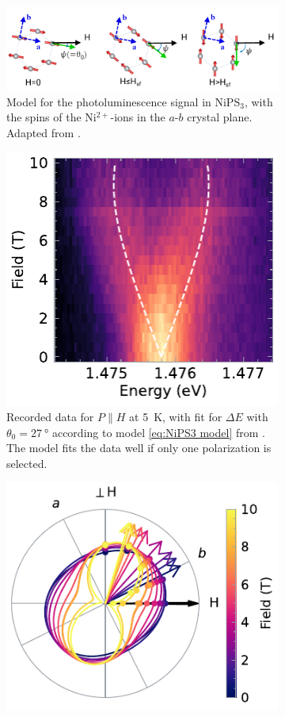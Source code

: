 \documentclass[
	twoside,
	parskip=half,
	a4paper,
]{scrbook}
\begin{document}
\begin{figure}
	\centering
	\begin{subfigure}{\textwidth}
		\centering
		\includegraphics[width=.8\textwidth]{../figures/NiPS3_magnon_S2.png}
		\caption{Model for the photoluminescence signal in NiPS$_3$, with the spins of the Ni$^{2+}$-ions in the $a$-$b$ crystal plane. Adapted from \cite[Figure S2]{NiPS3_magnon_gap}.}
		\label{fig:NiPS3 linear model}
	\end{subfigure}
	\begin{subfigure}[t]{2.5in}
		\centering
		\includegraphics{../figures/2024-04-21 NiPS3 single polarisation.pdf}
		\caption{Recorded data for $P\parallel H$ at \SI{5}{K}, with fit for $\Delta E$ with $\theta_0 = \SI{27}{\degree}$ according to model \autoref{eq:NiPS3 model} from \cite{NiPS3_magnon_gap}.
		The model fits the data well if only one polarization is selected.
		}
		\label{fig:NiPS3 model}
	\end{subfigure}
	\begin{subfigure}[t]{3in}
		\centering
		\includegraphics{../figures/2024-04-07 NiPS3 polarisation.pdf}

\end{subfigure}
\end{figure}
\end{document}
